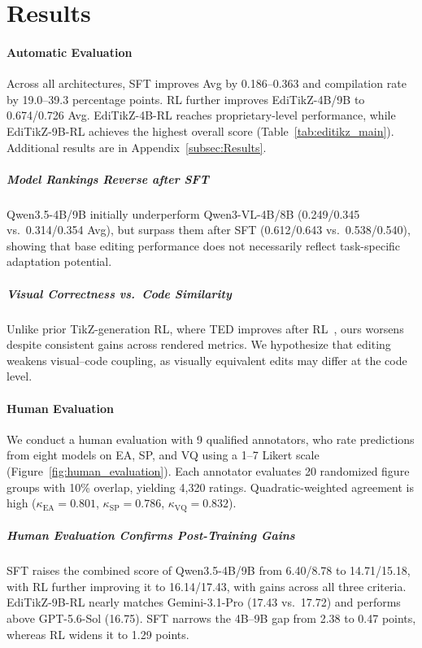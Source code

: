 \section{Results}
\label{sec:Results}

\paragraph{Automatic Evaluation}
Across all architectures, SFT improves Avg by 0.186--0.363 and compilation rate by 19.0--39.3 percentage points. RL further improves EdiTikZ-4B/9B to 0.674/0.726 Avg. EdiTikZ-4B-RL reaches proprietary-level performance, while EdiTikZ-9B-RL achieves the highest overall score (Table~\ref{tab:editikz_main}). Additional results are in Appendix~\ref{subsec:Results}.

\subparagraph{Model Rankings Reverse after SFT}
Qwen3.5-4B/9B initially underperform Qwen3-VL-4B/8B (0.249/0.345 vs.\ 0.314/0.354 Avg), but surpass them after SFT (0.612/0.643 vs.\ 0.538/0.540), showing that base editing performance does not necessarily reflect task-specific adaptation potential.

\subparagraph{Visual Correctness vs.\ Code Similarity}
Unlike prior TikZ-generation RL, where TED improves after RL~\citep{greisinger2026tikzilla,zeng2026davinci}, ours worsens despite consistent gains across rendered metrics. We hypothesize that editing weakens visual--code coupling, as visually equivalent edits may differ at the code level.



\paragraph{Human Evaluation}
We conduct a human evaluation with 9 qualified annotators, who rate predictions from eight models on EA, SP, and VQ using a 1--7 Likert scale (Figure~\ref{fig:human_evaluation}). Each annotator evaluates 20 randomized figure groups with 10\% overlap, yielding 4,320 ratings. Quadratic-weighted agreement is high ($\kappa_{\mathrm{EA}}=0.801$, $\kappa_{\mathrm{SP}}=0.786$, $\kappa_{\mathrm{VQ}}=0.832$).

\subparagraph{Human Evaluation Confirms Post-Training Gains}
SFT raises the combined score of Qwen3.5-4B/9B from 6.40/8.78 to 14.71/15.18, with RL further improving it to 16.14/17.43, with gains across all three criteria. EdiTikZ-9B-RL nearly matches Gemini-3.1-Pro (17.43 vs.\ 17.72) and performs above GPT-5.6-Sol (16.75). SFT narrows the 4B--9B gap from 2.38 to 0.47 points, whereas RL widens it to 1.29 points.

